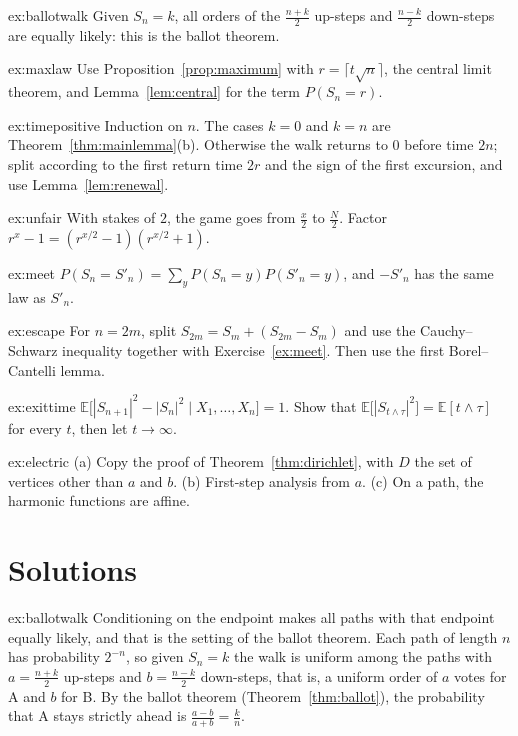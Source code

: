 \begin{hint}{ex:ballotwalk}
Given $S_n=k$, all orders of the $\frac{n+k}2$ up-steps and $\frac{n-k}2$ down-steps are equally likely: this is the ballot theorem.
\end{hint}
\begin{hint}{ex:maxlaw}
Use Proposition~\ref{prop:maximum} with $r=\lceil t\sqrt n\rceil$, the central limit theorem, and Lemma~\ref{lem:central} for the term $P(S_n=r)$.
\end{hint}
\begin{hint}{ex:timepositive}
Induction on $n$. The cases $k=0$ and $k=n$ are Theorem~\ref{thm:mainlemma}(b). Otherwise the walk returns to $0$ before time $2n$; split according
to the first return time $2r$ and the sign of the first excursion, and use Lemma~\ref{lem:renewal}.
\end{hint}
\begin{hint}{ex:unfair}
With stakes of $2$, the game goes from $\frac x2$ to $\frac N2$. Factor $r^x-1=(r^{x/2}-1)(r^{x/2}+1)$.
\end{hint}
\begin{hint}{ex:meet}
$P(S_n=S'_n)=\sum_yP(S_n=y)P(S'_n=y)$, and $-S'_n$ has the same law as $S'_n$.
\end{hint}
\begin{hint}{ex:escape}
For $n=2m$, split $S_{2m}=S_m+(S_{2m}-S_m)$ and use the Cauchy--Schwarz inequality together with Exercise~\ref{ex:meet}. Then use the first
Borel--Cantelli lemma.
\end{hint}
\begin{hint}{ex:exittime}
$\mathbb E\bigl[|S_{n+1}|^2-|S_n|^2\mid X_1,\dots,X_n\bigr]=1$. Show that $\mathbb E\bigl[|S_{t\wedge\tau}|^2\bigr]=\mathbb E[t\wedge\tau]$ for every $t$, then let $t\to\infty$.
\end{hint}
\begin{hint}{ex:electric}
(a) Copy the proof of Theorem~\ref{thm:dirichlet}, with $D$ the set of vertices other than $a$ and $b$. (b) First-step analysis from $a$.
(c) On a path, the harmonic functions are affine.
\end{hint}

\section{Solutions}

\begin{solution}{ex:ballotwalk}
\idea Conditioning on the endpoint makes all paths with that endpoint equally likely, and that is the setting of the
ballot theorem.
\writeup Each path of length $n$ has probability $2^{-n}$, so given $S_n=k$ the walk is uniform among the paths with $a=\frac{n+k}2$ up-steps
and $b=\frac{n-k}2$ down-steps, that is, a uniform order of $a$ votes for A and $b$ for B. By the ballot theorem (Theorem~\ref{thm:ballot}),
the probability that A stays strictly ahead is $\frac{a-b}{a+b}=\frac kn$.
\end{solution}

